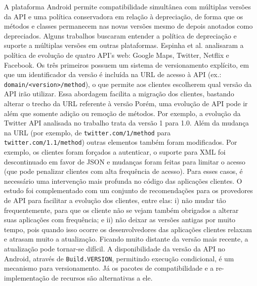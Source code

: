 A plataforma Android permite compatibilidade simultânea com múltiplas versões
da API e uma política conservadora em relação à depreciação, de forma que os
métodos e classes permanecem nas novas versões mesmo de depois anotados como
depreciados. Alguns trabalhos buscaram entender a política de depreciação e
suporte a múltiplas versões em outras plataformas. Espinha et al. \cite{Espinha2014}
analisaram a política de evolução de quatro API's web: Google Maps, Twitter, 
Netflix e Facebook. Os três primeiros possuem um sistema de versionamento
explícito, em que um identificador da versão é incluída na URL de acesso à API
(ex.: \texttt{domain/<version>/method}), o que permite aos clientes escolherem qual
versão da API irão utilizar. Essa abordagem facilita a migração dos clientes, bastando
alterar o trecho da URL referente à versão  Porém, uma evolução de API pode ir além que
somente adição ou remoção de métodos. Por exemplo, a evolução da Twitter API analisada
no trabalho trata da versão 1 para 1.0. Além da mudança na URL (por exemplo, de
\texttt{twitter.com/1/method} para \texttt{twitter.com/1.1/method}) outras elementos
também foram modificados. Por exemplo, os clientes foram forçados a autenticar,
o suporte para XML foi descontinuado em favor de JSON e mudanças foram feitas para limitar
o acesso (que pode penalizar clientes com alta frequência de acesso). Para esses casos,
é necessário uma intervenção mais profunda no código das aplicações clientes. O estudo
foi complementado com um conjunto de recomendações para os provedores de API para
facilitar a evolução dos clientes, entre elas: i) não mudar tão frequentemente, para
que os cliente não se vejam também obrigados a alterar suas aplicações com frequência;
e ii) não deixar as versões antigas por muito tempo, pois quando  isso ocorre os
desenvolvedores das aplicações clientes relaxam e atrasam muito a atualização.
Ficando muito distante da versão mais recente, a atualização pode tornar-se difícil.
A disponibilidade da versão da API no Android, através de \texttt{Build.VERSION},
permitindo execução condicional, é um mecanismo para versionamento. Já os pacotes
de compatibilidade e a re-implementação de recursos são alternativas a ele.

